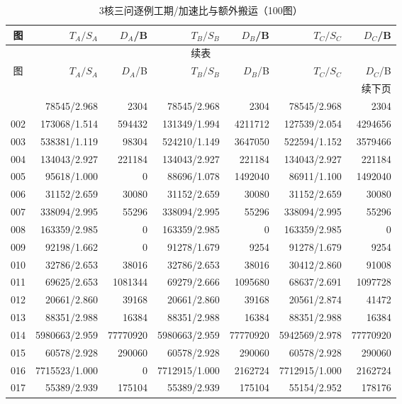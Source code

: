 \begin{longtable}{crrrrrr}
\caption{3核三问逐例工期/加速比与额外搬运（100图）}\label{tab:detail-3}\\
\toprule
图 & $T_A/S_A$ & $D_A$/B & $T_B/S_B$ & $D_B$/B & $T_C/S_C$ & $D_C$/B \\
\midrule
\endfirsthead
\multicolumn{7}{c}{续表}\\
\toprule
图 & $T_A/S_A$ & $D_A$/B & $T_B/S_B$ & $D_B$/B & $T_C/S_C$ & $D_C$/B \\
\midrule
\endhead
\midrule\multicolumn{7}{r}{续下页}\\
\endfoot
\bottomrule
\endlastfoot
001 & 78545/2.968 & 2304 & 78545/2.968 & 2304 & 78545/2.968 & 2304 \\
002 & 173068/1.514 & 594432 & 131349/1.994 & 4211712 & 127539/2.054 & 4294656 \\
003 & 538381/1.119 & 98304 & 524210/1.149 & 3647050 & 522594/1.152 & 3579466 \\
004 & 134043/2.927 & 221184 & 134043/2.927 & 221184 & 134043/2.927 & 221184 \\
005 & 95618/1.000 & 0 & 88696/1.078 & 1492040 & 86911/1.100 & 1492040 \\
006 & 31152/2.659 & 30080 & 31152/2.659 & 30080 & 31152/2.659 & 30080 \\
007 & 338094/2.995 & 55296 & 338094/2.995 & 55296 & 338094/2.995 & 55296 \\
008 & 163359/2.985 & 0 & 163359/2.985 & 0 & 163359/2.985 & 0 \\
009 & 92198/1.662 & 0 & 91278/1.679 & 9254 & 91278/1.679 & 9254 \\
010 & 32786/2.653 & 38016 & 32786/2.653 & 38016 & 30412/2.860 & 91008 \\
011 & 69625/2.653 & 1081344 & 69279/2.666 & 1095680 & 68637/2.691 & 1097728 \\
012 & 20661/2.860 & 39168 & 20661/2.860 & 39168 & 20561/2.874 & 41472 \\
013 & 88351/2.988 & 16384 & 88351/2.988 & 16384 & 88351/2.988 & 16384 \\
014 & 5980663/2.959 & 77770920 & 5980663/2.959 & 77770920 & 5942569/2.978 & 77770920 \\
015 & 60578/2.928 & 290060 & 60578/2.928 & 290060 & 60578/2.928 & 290060 \\
016 & 7715523/1.000 & 0 & 7712915/1.000 & 2162724 & 7712915/1.000 & 2162724 \\
017 & 55389/2.939 & 175104 & 55389/2.939 & 175104 & 55154/2.952 & 178176 \\

\end{longtable}
